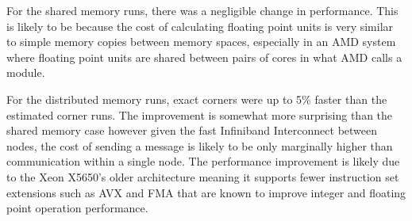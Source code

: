 For the shared memory runs, there was a negligible change in performance. This
is likely to be because the cost of calculating floating point units is very
similar to simple memory copies between memory spaces, especially in an AMD
system where floating point units are shared between pairs of cores in what AMD
calls a module.

For the distributed memory runs, exact corners were up to 5\% faster than the
estimated corner runs. The improvement is somewhat more surprising than the
shared memory case however given the fast Infiniband Interconnect between nodes,
the cost of sending a message is likely to be only marginally higher than
communication within a single node. The performance improvement is likely due to
the Xeon X5650's older architecture meaning it supports fewer instruction set
extensions such as AVX and FMA that are known to improve integer and floating
point operation performance.
